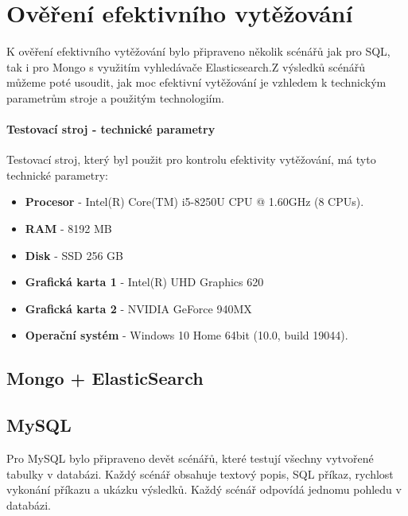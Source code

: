 \lstset{style=sqlstyle}

\chapter{Ověření efektivního vytěžování}
K ověření efektivního vytěžování bylo připraveno několik scénářů jak pro SQL, tak i pro Mongo s využitím vyhledávače Elasticsearch.Z výsledků scénářů můžeme poté usoudit, jak moc efektivní vytěžování je vzhledem k technickým parametrům stroje a použitým technologiím.

\subsubsection{Testovací stroj - technické parametry}
Testovací stroj, který byl použit pro kontrolu efektivity vytěžování, má tyto technické parametry:
\begin{itemize}
\item \textbf{Procesor} - Intel(R) Core(TM) i5-8250U CPU @ 1.60GHz (8 CPUs).
\item \textbf{RAM} - 8192 MB
\item \textbf{Disk} - SSD 256 GB
\item \textbf{Grafická karta 1} - Intel(R) UHD Graphics 620
\item \textbf{Grafická karta 2} - NVIDIA GeForce 940MX
\item \textbf{Operační systém} - Windows 10 Home 64bit (10.0, build 19044).

\end{itemize}

\section{Mongo + ElasticSearch}

\section{MySQL} \label{sec:efektivni_vytezovani_sql}
Pro MySQL bylo připraveno devět scénářů, které testují všechny vytvořené tabulky v databázi. Každý scénář obsahuje textový popis, SQL příkaz, rychlost vykonání příkazu a ukázku výsledků. Každý scénář odpovídá jednomu pohledu v databázi.

